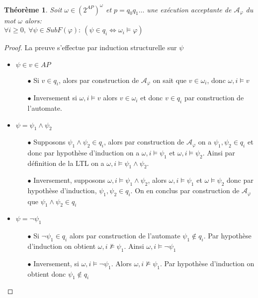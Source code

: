 \documentclass[12pt,a4paper]{article}
\theoremstyle{plain}
\newtheorem{thm}{Théorème}
\theoremstyle{definition}
\begin{document}
\begin{thm}
	\label{thm2}
	Soit $\omega \in (2^{AP})^\omega$ et $p=q_0q_1\dots$ une exécution acceptante de $\mathcal{A}_\varphi$ du mot $\omega$ alors: \\
	$\forall i \geq 0,\: \forall \psi \in SubF(\varphi): \: (\psi \in q_i \Leftrightarrow \omega_i \models \varphi)$
\end{thm}
\begin{proof}
	La preuve s'effectue par induction structurelle sur $\psi$\\
	\begin{itemize}
		\item $\psi \in v \in AP$
		\begin{itemize}
			\item[$\bullet$] Si $v \in q_i$, alors par construction de $\mathcal{A}_\varphi$ on sait que $v \in \omega_i$, donc $\omega, i \models v$
			\item[$\bullet$] Inversement si $\omega, i \models v$ alors $v \in \omega_i$ et donc $v \in q_i$ par construction de l'automate.
		\end{itemize}
		\item $\psi = \psi_1 \land \psi_2$
		\begin{itemize}
			\item[$\bullet$] Supposons $\psi_1 \land \psi_2 \in q_i$, alors par construction de $\mathcal{A}_\varphi$ on a $\psi_1, \psi_2 \in q_i$ et donc par hypothèse d'induction on a $\omega, i \models \psi_1$ et $\omega, i \models \psi_2$. Ainsi par définition de la LTL on a $\omega, i \models \psi_1 \land \psi_2$.
			\item[$\bullet$] Inversement, supposons $\omega, i \models \psi_1 \land \psi_2$, alors $\omega, i \models \psi_1$ et $\omega \models \psi_2$ donc par hypothèse d'induction, $\psi_1, \psi_2 \in q_i$. On en conclus par construction de $\mathcal{A}_\varphi$ que $\psi_1 \land \psi_2 \in q_i$
 		\end{itemize}
 		\item $\psi = \lnot \psi_1$
 		\begin{itemize}
 			\item[$\bullet$] Si $\lnot \psi_1 \in q_i$ alors par construction de l'automate $\psi_1 \not \in q_i$. Par hypothèse d'induction on obtient $\omega, i \not \models \psi_1$. Ainsi $\omega, i \models \lnot \psi_1$
 			\item[$\bullet$] Inversement, si $\omega, i \models \lnot \psi_1$. Alors $\omega, i \not \models \psi_1$. Par hypothèse d'induction on obtient donc $\psi_1 \not \in q_i$

\end{itemize}
\end{itemize}
\end{proof}
\end{document}
